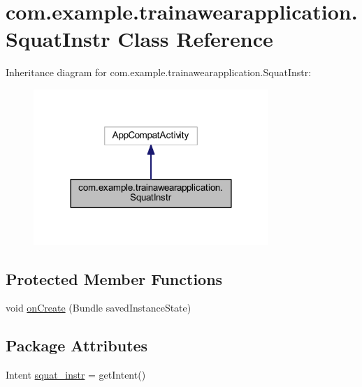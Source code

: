 \hypertarget{classcom_1_1example_1_1trainawearapplication_1_1_squat_instr}{}\section{com.\+example.\+trainawearapplication.\+Squat\+Instr Class Reference}
\label{classcom_1_1example_1_1trainawearapplication_1_1_squat_instr}


Inheritance diagram for com.\+example.\+trainawearapplication.\+Squat\+Instr\+:
\nopagebreak
\begin{figure}[H]
\begin{center}
\leavevmode
\includegraphics[width=252pt]{classcom_1_1example_1_1trainawearapplication_1_1_squat_instr__inherit__graph}
\end{center}
\end{figure}
\subsection*{Protected Member Functions}
\begin{DoxyCompactItemize}
\item 
void \mbox{\hyperlink{classcom_1_1example_1_1trainawearapplication_1_1_squat_instr_a7e7f753fc9bfbdc0dc8b8db20a59713e}{on\+Create}} (Bundle saved\+Instance\+State)
\end{DoxyCompactItemize}
\subsection*{Package Attributes}
\begin{DoxyCompactItemize}
\item 
Intent \mbox{\hyperlink{classcom_1_1example_1_1trainawearapplication_1_1_squat_instr_ae91e424e0c96c8873dfc394e25a0ff2b}{squat\+\_\+instr}} = get\+Intent()
\end{DoxyCompactItemize}
